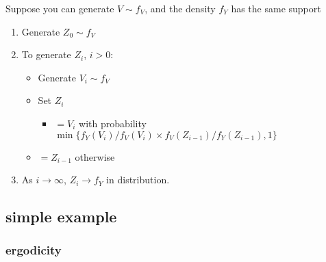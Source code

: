 \documentclass[11pt]{article}
\begin{document}
     Suppose you can generate $V \sim f_V$, and the density $f_Y$
     has the same support
\begin{enumerate}
\item Generate $Z_0 \sim f_V$
\item To generate $Z_i$, $i > 0$:
\begin{itemize}
\item Generate $V_i \sim f_V$
\item Set $Z_i$
\begin{itemize}
\item $= V_i$ with probability $\min\{ f_Y(V_i)/ f_V(V_i)
            \times f_V(Z_{i-1}) / f_Y(Z_{i-1}), 1\}$
\end{itemize}
\item $= Z_{i-1}$ otherwise
\end{itemize}
\item As $i \to \infty$, $Z_i \to f_Y$ in distribution.
\end{enumerate}
\subsection{simple example}
\label{sec-3-2}
\subsubsection{ergodicity}
\label{sec-3-2-1}
\end{document}
